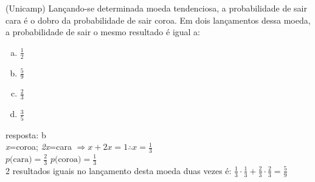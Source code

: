 \begin{ex}
  (Unicamp) Lançando-se determinada moeda tendenciosa, a probabilidade de sair cara é o dobro da probabilidade de sair coroa. Em dois lançamentos dessa moeda, a probabilidade de sair o mesmo resultado é igual a:
    \begin{enumerate}   [(a)]
        \item $\frac{1}{2}$
        \item $\frac{5}{9}$
        \item $\frac{2}{3}$
        \item $\frac{3}{5}$
    \end{enumerate}
     \begin{sol}
      resposta: b \\
     \textit{x}=coroa;\hspace{0,2cm} \textit{2x}=cara \hspace{0,4cm}
       $\Longrightarrow x+2x=1  \therefore x=\frac{1}{3}$ \\
       $ p \text{(cara)} =\frac{2}{3} $\hspace{0,4cm} $p\text{(coroa)}=\frac{1}{3}$ \\
       2 resultados iguais no lançamento desta moeda duas vezes é: $\frac{1}{3}\cdot\frac{1}{3}+\frac{2}{3}\cdot\frac{2}{3}=\frac{5}{9}$
       \end{sol}
 \end{ex}